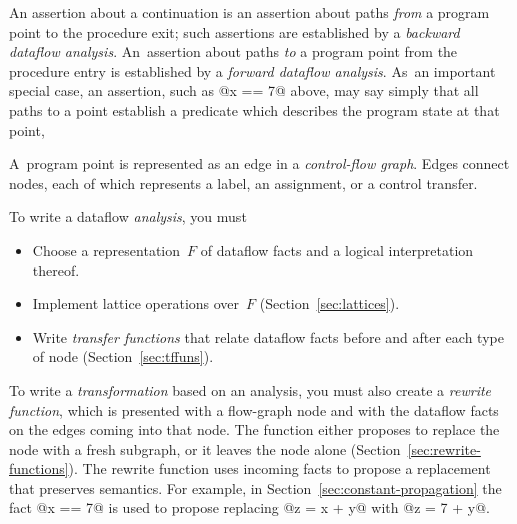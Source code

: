 \documentclass[blockstyle,preprint,natbib,nocopyrightspace]{sigplanconf}
\let\cite\citep
\newcommand\delendum[1]{\relax\ifvmode\else\unskip\fi\relax}
\newcommand\secref[1]{Section~\ref{sec:#1}}
\begin{document}
An assertion about a continuation is an assertion about paths
\emph{from} a program point 
to the procedure {exit};
such assertions are established by a \emph{backward dataflow analysis}.
An~assertion about paths \emph{to} a program point from the procedure
{entry} is established by a \emph{forward dataflow analysis}.
As~an important special case,
an assertion, such as @x == 7@ above,
 may say simply
that all paths to a point establish a predicate
which describes the program state at that point,


A~program point is represented as an edge in
a \emph{control-flow graph}.
Edges connect nodes, each of which represents a label, an assignment, or
a control transfer.

To write a dataflow \emph{analysis}, you must 
\begin{itemize}
\item
Choose a representation~$F$ of dataflow facts and a logical interpretation
thereof.
\item
Implement lattice operations over~$F$ (\secref{lattices}).
\item
Write \emph{transfer functions} that relate dataflow facts before and
after each type of node (\secref{tffuns}).
\delendum{I'd italicise key words from all three bullets, or none. NR:
It's not a question of bullets; the key concepts which are possibly
new to readers are transfer
functions and rewrite functions, which is why they are italicized.}
\end{itemize}

To write a \emph{transformation}
based on an analysis, you
must also
create a \emph{rewrite function}, which is presented with a
flow-graph node and with the dataflow facts on the edges coming
into that node.
The function either proposes to replace the node with a
fresh subgraph, or it leaves the node alone (\secref{rewrite-functions}).
The rewrite function uses incoming facts to propose a replacement
that preserves semantics.
For example, in \secref{constant-propagation} the fact @x == 7@ is
used to propose replacing @z = x + y@ with @z = 7 + y@.
\end{document}
